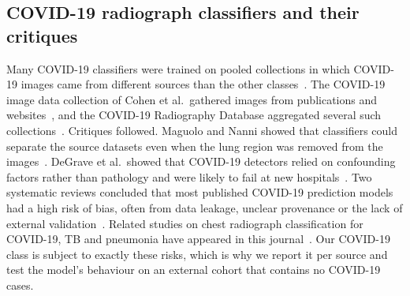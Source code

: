 \subsection{COVID-19 radiograph classifiers and their critiques}
Many COVID-19 classifiers were trained on pooled collections in which COVID-19 images came from different sources than the other classes~\cite{wang2020covidnet,apostolopoulos2020covid,chowdhury2020can,rahman2021exploring}. The COVID-19 image data collection of Cohen et al.\ gathered images from publications and websites~\cite{cohen2020covid}, and the COVID-19 Radiography Database aggregated several such collections~\cite{chowdhury2020can,rahman2021exploring}. Critiques followed. Maguolo and Nanni showed that classifiers could separate the source datasets even when the lung region was removed from the images~\cite{maguolo2020critic}. DeGrave et al.\ showed that COVID-19 detectors relied on confounding factors rather than pathology and were likely to fail at new hospitals~\cite{degrave2021ai}. Two systematic reviews concluded that most published COVID-19 prediction models had a high risk of bias, often from data leakage, unclear provenance or the lack of external validation~\cite{wynants2020prediction,roberts2021common}. Related studies on chest radiograph classification for COVID-19, TB and pneumonia have appeared in this journal~\cite{nayak2021application,iqbal2023tuberculosis,amin2024automated,arias2024analysis}. Our COVID-19 class is subject to exactly these risks, which is why we report it per source and test the model's behaviour on an external cohort that contains no COVID-19 cases.


